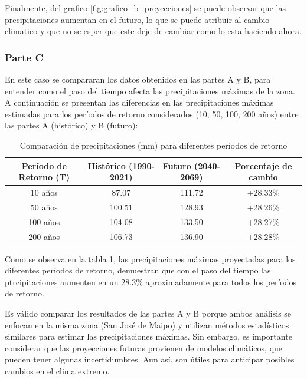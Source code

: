 \documentclass{article}  %
\begin{document}
Finalmente, del grafico \ref{fig:grafico_b_preyecciones} se puede observar que las precipitaciones aumentan en el futuro, lo que se puede atribuir al cambio climatico y que no se esper que este deje de cambiar como lo esta haciendo ahora.

\subsubsection*{Parte C}

En este caso se compararan los datos obtenidos en las partes A y B, para entender como el paso del tiempo afecta las precipitaciones máximas de la zona. \\

A continuación se presentan las diferencias en las precipitaciones máximas estimadas para los períodos de retorno considerados (10, 50, 100, 200 años) entre las partes A (histórico) y B (futuro):

\begin{table}[H]
  \centering
  \caption{Comparación de precipitaciones (mm) para diferentes períodos de retorno}
  \begin{tabular}{|c|c|c|c|}
  \hline
  \textbf{Período de Retorno (T)} & \textbf{Histórico (1990-2021)} & \textbf{Futuro (2040-2069)} & \textbf{Porcentaje de cambio} \\ \hline
  10 años  & 87.07 & 111.72 & +28.33\% \\ \hline
  50 años  & 100.51 & 128.93 & +28.26\% \\ \hline
  100 años & 104.08 & 133.50 & +28.27\% \\ \hline
  200 años & 106.73 & 136.90 & +28.28\% \\ \hline
  \end{tabular}
  \label{table:comparacion_c}
\end{table}

Como se observa en la tabla \ref{table:comparacion_c}, las precipitaciones máximas proyectadas para los diferentes períodos de retorno, demuestran que con el paso del tiempo las ptrcipitaciones aumenten en un 28.3\% aproximadamente para todos los períodos de retorno. 

Es válido comparar los resultados de las partes A y B porque ambos análisis se enfocan en la misma zona (San José de Maipo) y utilizan métodos estadísticos similares para estimar las precipitaciones máximas. Sin embargo, es importante considerar que las proyecciones futuras provienen de modelos climáticos, que pueden tener algunas incertidumbres. Aun así, son útiles para anticipar posibles cambios en el clima extremo.
\end{document}
